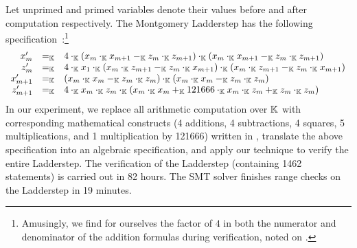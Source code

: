 Let unprimed and primed variables denote their values before and after
computation respectively.
The Montgomery Ladderstep has the following
specification~\cite{M:87:SPEC}:\footnote{Amusingly, we find for
  ourselves the factor of $4$ in both the numerator and denominator of
  the addition formulas during verification, noted on
  \cite[p.~261]{M:87:SPEC}.}
\vspace{-.5em}
\[
\begin{array}{rcl}
  x'_{m} & \Feq & 4 \Ftimes (x_m \Ftimes x_{m+1} \Fminus z_m \Ftimes z_{m+1})
               \Ftimes (x_m \Ftimes x_{m+1} \Fminus z_m \Ftimes z_{m+1}) \\
  z'_{m} & \Feq & 4 \Ftimes x_1 \Ftimes (x_m \Ftimes z_{m+1} \Fminus
               z_m \Ftimes x_{m+1})
               \Ftimes (x_m \Ftimes z_{m+1} \Fminus z_m \Ftimes x_{m+1}) \\
  x'_{m+1} & \Feq & (x_m \Ftimes x_m \Fminus z_m \Ftimes z_m) \Ftimes
                 (x_m \Ftimes x_m \Fminus z_m \Ftimes z_m) \\
  z'_{m+1} & \Feq & 4 \Ftimes x_m \Ftimes z_m \Ftimes
                 (x_m \Ftimes x_m \Fplus 121666 \Ftimes x_m \Ftimes z_m \Fplus
                 z_m \Ftimes z_m)
\end{array}
\vspace{-.5em}
\]
In our experiment, we replace all arithmetic computation over $\mathbb{K}$
with corresponding mathematical constructs (4 additions, 4 subtractions, 4 squares, 5
multiplications, and 1 multiplication by 121666) written in \mydsl,
translate the above specification into an algebraic specification, and
apply our technique to verify the entire Ladderstep.
The verification of the Ladderstep (containing 1462 statements) is carried out in 82 hours.
The SMT solver finishes range checks on the Ladderstep in 19 minutes.



%
% 
%

